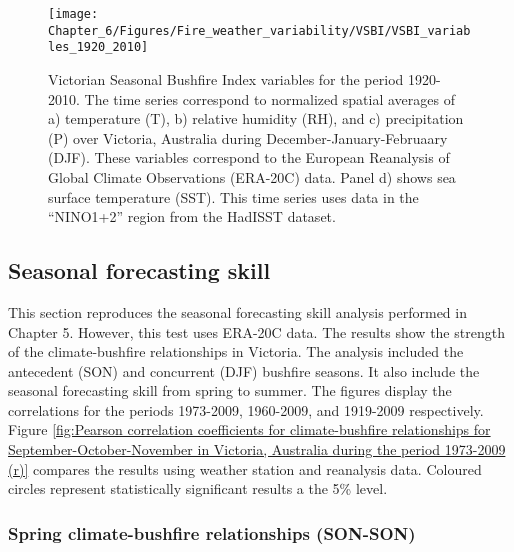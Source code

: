 \begin{figure}[h]
\noindent \begin{centering}
\texttt{[image: Chapter\_6/Figures/Fire\_weather\_variability/VSBI/VSBI\_variables\_1920\_2010]}
\par\end{centering}

\caption[Victorian Seasonal Bushfire Index variables for the period 1920-2010]{Victorian Seasonal Bushfire Index variables for the period 1920-2010.
The time series correspond to normalized spatial averages of a) temperature
(T), b) relative humidity (RH), and c) precipitation (P) over Victoria,
Australia during December-January-Februaary (DJF). These variables
correspond to the European Reanalysis of Global Climate Observations
(ERA-20C) data. Panel d) shows sea surface temperature (SST). This
time series uses data in the ``NINO1+2'' region from the HadISST
dataset. \label{fig:Victorian Seasonal Bushfire Index variables time series during December-January-February in Victoria, Australia for the period 1920-2010 (r)}}


\end{figure}



\subsection{Seasonal forecasting skill}

This section reproduces the seasonal forecasting skill analysis performed
in Chapter 5. However, this test uses ERA-20C data. The results show
the strength of the climate-bushfire relationships in Victoria. The
analysis included the antecedent (SON) and concurrent (DJF) bushfire
seasons. It also include the seasonal forecasting skill from spring
to summer. The figures display the correlations for the periods 1973-2009,
1960-2009, and 1919-2009 respectively. Figure \ref{fig:Pearson correlation coefficients for climate-bushfire relationships for September-October-November in Victoria, Australia during the period 1973-2009 (r)}
compares the results using weather station and reanalysis data. Coloured
circles represent statistically significant results a the 5\% level.


\subsubsection{Spring climate-bushfire relationships (SON-SON)}

